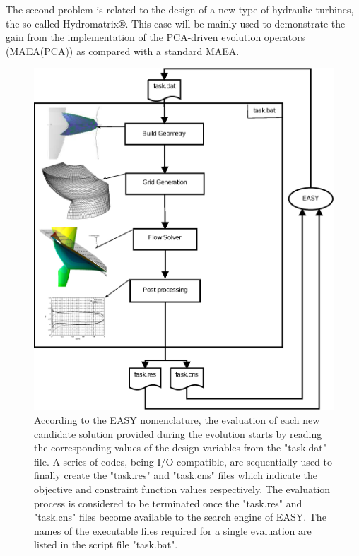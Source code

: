 The second problem is related to the design of a new type of hydraulic turbines, the so-called Hydromatrix$\circledR$. This case will be mainly used to demonstrate the gain from the implementation of the PCA-driven evolution operators (MAEA(PCA)) as compared with a standard MAEA.     

\begin{figure}[h!]
\centering
\includegraphics[width=135mm]{Optimizationloop.eps} 
\caption{According to the EASY nomenclature, the evaluation of each new candidate solution provided during the evolution starts by reading the corresponding values of the design variables from the "task.dat" file. A series of codes, being I/O compatible, are sequentially used to finally create the "task.res" and "task.cns" files which indicate the objective and constraint function values respectively. The evaluation process is considered to be terminated once the "task.res" and "task.cns" files  become available to the search engine of EASY. The names of the executable files required for a single evaluation are listed in the script file "task.bat". }
\label{evaltool}
\end{figure}      
      

